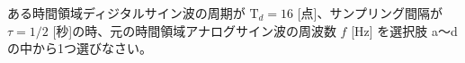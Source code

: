 ある時間領域ディジタルサイン波の周期が $\textrm{T}_d = 16$ [点]、サンプリング間隔が $\tau = 1/2$ [秒]の時、元の時間領域アナログサイン波の周波数 $f$ [Hz] を選択肢 a〜d の中から1つ選びなさい。
